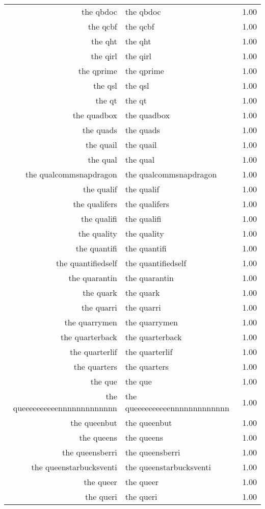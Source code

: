 \begin{table}[ht]
\begin{tabular}{rlr}
  the qbdoc & the qbdoc & 1.00 \\ 
  the qcbf & the qcbf & 1.00 \\ 
  the qht & the qht & 1.00 \\ 
  the qirl & the qirl & 1.00 \\ 
  the qprime & the qprime & 1.00 \\ 
  the qsl & the qsl & 1.00 \\ 
  the qt & the qt & 1.00 \\ 
  the quadbox & the quadbox & 1.00 \\ 
  the quads & the quads & 1.00 \\ 
  the quail & the quail & 1.00 \\ 
  the qual & the qual & 1.00 \\ 
  the qualcommsnapdragon & the qualcommsnapdragon & 1.00 \\ 
  the qualif & the qualif & 1.00 \\ 
  the qualifers & the qualifers & 1.00 \\ 
  the qualifi & the qualifi & 1.00 \\ 
  the quality & the quality & 1.00 \\ 
  the quantifi & the quantifi & 1.00 \\ 
  the quantifiedself & the quantifiedself & 1.00 \\ 
  the quarantin & the quarantin & 1.00 \\ 
  the quark & the quark & 1.00 \\ 
  the quarri & the quarri & 1.00 \\ 
  the quarrymen & the quarrymen & 1.00 \\ 
  the quarterback & the quarterback & 1.00 \\ 
  the quarterlif & the quarterlif & 1.00 \\ 
  the quarters & the quarters & 1.00 \\ 
  the que & the que & 1.00 \\ 
  the queeeeeeeeeennnnnnnnnnnnn & the queeeeeeeeeennnnnnnnnnnnn & 1.00 \\ 
  the queenbut & the queenbut & 1.00 \\ 
  the queens & the queens & 1.00 \\ 
  the queensberri & the queensberri & 1.00 \\ 
  the queenstarbucksventi & the queenstarbucksventi & 1.00 \\ 
  the queer & the queer & 1.00 \\ 
  the queri & the queri & 1.00 \\ 

\end{tabular}
\end{table}
